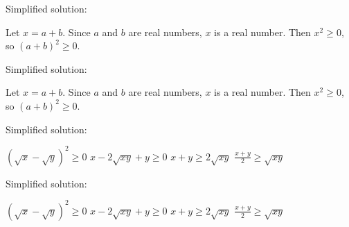 \documentclass{article}
\begin{document}



Simplified solution:
\begin{tcolorbox}[colback=blue!10, width=\linewidth]
Let $x = a+b$.  Since $a$ and $b$ are real numbers, $x$ is a real number.  Then $x^2 \ge 0$, so $(a+b)^2 \ge 0$.

\end{tcolorbox}



Simplified solution:
\begin{tcolorbox}[colback=blue!10, width=\linewidth]
Let $x = a+b$.  Since $a$ and $b$ are real numbers, $x$ is a real number.  Then $x^2 \ge 0$, so $(a+b)^2 \ge 0$.

\end{tcolorbox}



Simplified solution:
\begin{tcolorbox}[colback=blue!10, width=\linewidth]
$(\sqrt{x} - \sqrt{y})^2 \ge 0$
$x - 2\sqrt{xy} + y \ge 0$
$x + y \ge 2\sqrt{xy}$
$\frac{x+y}{2} \ge \sqrt{xy}$
\end{tcolorbox}



Simplified solution:
\begin{tcolorbox}[colback=blue!10, width=\linewidth]
$(\sqrt{x} - \sqrt{y})^2 \ge 0$
$x - 2\sqrt{xy} + y \ge 0$
$x + y \ge 2\sqrt{xy}$
$\frac{x+y}{2} \ge \sqrt{xy}$
\end{tcolorbox}
\end{document}
